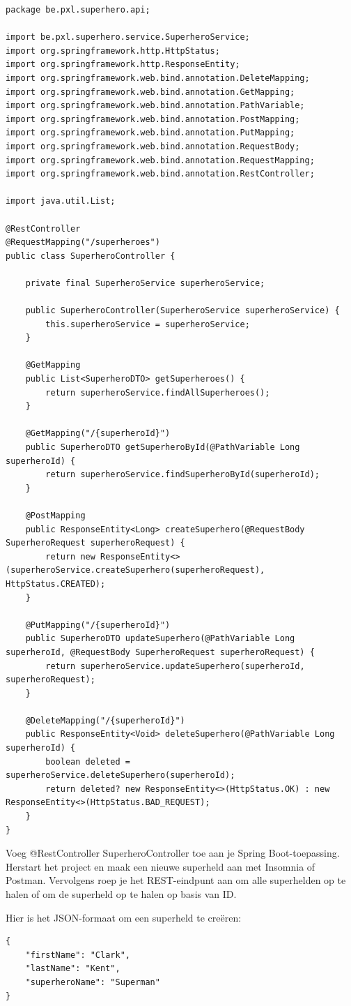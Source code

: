 \begin{lstlisting}[frame=single]
package be.pxl.superhero.api;

import be.pxl.superhero.service.SuperheroService;
import org.springframework.http.HttpStatus;
import org.springframework.http.ResponseEntity;
import org.springframework.web.bind.annotation.DeleteMapping;
import org.springframework.web.bind.annotation.GetMapping;
import org.springframework.web.bind.annotation.PathVariable;
import org.springframework.web.bind.annotation.PostMapping;
import org.springframework.web.bind.annotation.PutMapping;
import org.springframework.web.bind.annotation.RequestBody;
import org.springframework.web.bind.annotation.RequestMapping;
import org.springframework.web.bind.annotation.RestController;

import java.util.List;

@RestController
@RequestMapping("/superheroes")
public class SuperheroController {

	private final SuperheroService superheroService;

	public SuperheroController(SuperheroService superheroService) {
		this.superheroService = superheroService;
	}

	@GetMapping
	public List<SuperheroDTO> getSuperheroes() {
		return superheroService.findAllSuperheroes();
	}

	@GetMapping("/{superheroId}")
	public SuperheroDTO getSuperheroById(@PathVariable Long superheroId) {
		return superheroService.findSuperheroById(superheroId);
	}
	
	@PostMapping
	public ResponseEntity<Long> createSuperhero(@RequestBody SuperheroRequest superheroRequest) {
		return new ResponseEntity<>(superheroService.createSuperhero(superheroRequest), HttpStatus.CREATED);
	}
	
	@PutMapping("/{superheroId}")
	public SuperheroDTO updateSuperhero(@PathVariable Long superheroId, @RequestBody SuperheroRequest superheroRequest) {
		return superheroService.updateSuperhero(superheroId, superheroRequest);
	}
	
	@DeleteMapping("/{superheroId}")
	public ResponseEntity<Void> deleteSuperhero(@PathVariable Long superheroId) {
		boolean deleted = superheroService.deleteSuperhero(superheroId);
		return deleted? new ResponseEntity<>(HttpStatus.OK) : new ResponseEntity<>(HttpStatus.BAD_REQUEST);
	}
}
\end{lstlisting}

\begin{oefening}
Voeg @RestController SuperheroController toe aan je Spring Boot-toepassing. Herstart het project en maak een nieuwe superheld aan met Insomnia of Postman. Vervolgens roep je het REST-eindpunt aan om alle superhelden op te halen of om de superheld op te halen op basis van ID.

Hier is het JSON-formaat om een superheld te creëren:
\begin{lstlisting}
{
	"firstName": "Clark",
	"lastName": "Kent",
	"superheroName": "Superman"
}
\end{lstlisting}
\end{oefening}

